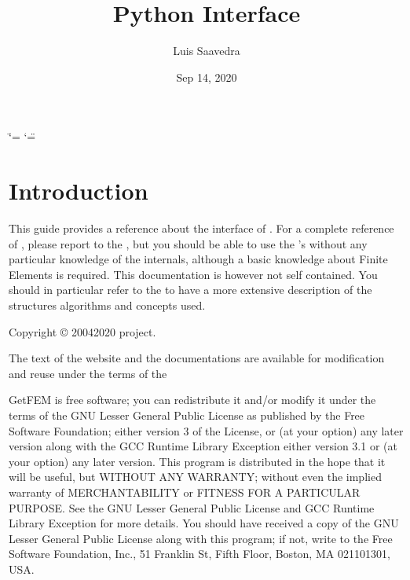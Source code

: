 \documentclass[a4paper,11pt,english]{sphinxmanual}
\title{Python Interface}
\date{Sep 14, 2020}
\author{Luis Saavedra}
\begin{document}
\ifdefined\shorthandoff
  \ifnum\catcode`\=\string=\active\shorthandoff{=}\fi
  \ifnum\catcode`\"=\active{}\fi
\fi

\pagestyle{empty}
\sphinxmaketitle
\pagestyle{plain}
\sphinxtableofcontents
\pagestyle{normal}
\label{\detokenize{python/index::doc}}



\chapter{Introduction}
\label{\detokenize{python/intro:introduction}}\label{\detokenize{python/intro:py-intro}}\label{\detokenize{python/intro::doc}}
This guide provides a reference about the  interface of . For a complete
reference of , please report to the , but you should be able
to use the ’s without any particular knowledge of the  internals,
although a basic knowledge about Finite Elements is required. This documentation
is however not self contained. You should in
particular refer to the  to have a more extensive
description of the structures algorithms and concepts used.

Copyright © 2004\sphinxhyphen{}2020  project.

The text of the  website and the documentations are available for modification and reuse under the terms of the 

GetFEM  is  free software;  you  can  redistribute  it  and/or modify it
under  the  terms  of the  GNU  Lesser General Public License as published
by  the  Free Software Foundation;  either version 3 of the License,  or
(at your option) any later version along with the GCC Runtime Library
Exception either version 3.1 or (at your option) any later version.
This program  is  distributed  in  the  hope  that it will be useful,  but
WITHOUT ANY WARRANTY; without even the implied warranty of MERCHANTABILITY
or  FITNESS  FOR  A PARTICULAR PURPOSE.  See the GNU Lesser General Public
License and GCC Runtime Library Exception for more details.
You  should  have received a copy of the GNU Lesser General Public License
along  with  this program;  if not, write to the Free Software Foundation,
Inc., 51 Franklin St, Fifth Floor, Boston, MA  02110\sphinxhyphen{}1301, USA.
\end{document}
